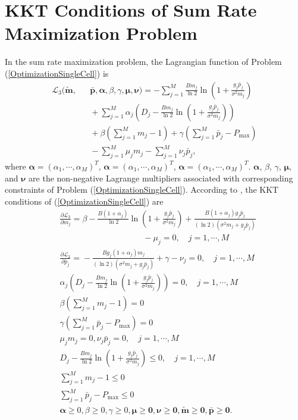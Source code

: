 \documentclass[journal]{IEEEtran}
\begin{document}
\section{KKT Conditions of Sum Rate Maximization Problem}
In the sum rate maximization problem, the Lagrangian function of Problem (\ref{OptimizationSingleCell}) is
\begin{eqnarray*}
\mathcal L_3(\pmb{\tilde m }, &&\!\!\!\!\!\!\!\!\!\!\pmb{\bar p}, \pmb{\alpha}, \beta ,\gamma, \pmb \mu, \pmb \nu)
=
-{\sum_{j=1}^M \frac{B m_j}{\ln2} \ln\left(1+\frac{g_j \bar p_j}{\sigma^2 m_j}\right)}
\\
 &&\!\!\!\!
+\sum_{j=1}^M \alpha_j \left({D_j-\frac{B m_j}{\ln2} \ln\left(1+\frac{g_j \bar p_j}{\sigma^2 m_j}\right)}\right)
\\
 &&\!\!\!\!
+\beta \left(\sum_{j=1}^{M}m_j -1\right)
+\gamma \left(\sum_{j=1}^M \bar p_j-P_{\max}\right)
\\
&&\!\!\!\!
-\sum_{j=1}^M \mu_j m_j -\sum_{j=1}^M \nu_j \bar p_j
,
\end{eqnarray*}
where $\pmb \alpha=(\alpha_1, \cdots, \alpha_M)^T$, $\pmb \alpha=(\alpha_1, \cdots, \alpha_M)^T$, $\pmb \alpha=(\alpha_1, \cdots, \alpha_M)^T$.
$\pmb \alpha$, $\beta$, $\gamma$, $\pmb \mu$, and $\pmb \nu$ are the non-negative Lagrange multipliers associated with corresponding constraints of Problem (\ref{OptimizationSingleCell}).
According to \cite{boyd2004convex}, the KKT conditions of (\ref{OptimizationSingleCell}) are
\begin{subequations}\label{KKT2}
\begin{align}
&\frac{\partial \mathcal L_3}
{\partial m_j}\!=\!
 \beta\!-\! {\frac{B(1\!+\!\alpha_j)}{\ln2}}  \!\ln\left(\!1\!\!+\!\!\frac{g_j \bar p_j}{\sigma^2 m_j}\!\right)
\!\!+\!\!
{\frac{B(1\!\!+\!\!\alpha_j){g_j \bar p_j}}{(\ln2)({\sigma^2 m_j\!\!+\!\!g_j\bar p_j})}}
\nonumber\\
&\qquad\qquad\qquad\qquad\qquad
-\mu_j= 0, \quad j =1, \cdots, M\\
&\frac{\partial \mathcal L_3}
{\partial \bar p_j}\!=\!-\frac{B{ g_j(1+\alpha_j)m_j}}{(\ln2){(\sigma^2 m_j\!+\!g_j\bar p_j)}} \!+\!\gamma
\!-\!\nu_j
\!=\!0, \quad j \!=\!1, \cdots, M\\
&\alpha_j \! \left(\!{D_j\!-\!\frac{B m_j}{\ln2} \ln\left(\!1\!+\!\frac{g_j \bar p_j}{\sigma^2 m_j}\!\right)}\!\right)
\!=\!0, \quad j \!=\!1, \cdots, M\\
&\beta \left(\sum_{j=1}^{M}m_j -1\right)
=0\\
&\gamma \left(\sum_{j=1}^M \bar p_j-P_{\max}\right)
=0\\
&\mu_jm_j=0, \nu_j\bar p_j=0,\quad j=1, \cdots, M \label{appendkktmunu}\\
&{D_j-\frac{B m_j}{\ln2} \ln\left(1+\frac{g_j \bar p_j}{\sigma^2 m_j}\right)}\leq 0,\quad j =1, \cdots, M\\
&\sum_{j=1}^{M}m_j-1
\leq 0\\
&{\sum_{j=1}^M \bar p_j}-P_{\max}
\leq 0\\
&\pmb \alpha \geq 0, \beta \geq 0,\gamma \geq 0, \pmb \mu \geq \pmb 0, \pmb \nu \geq \pmb 0,
\pmb {\tilde m } \geq \pmb 0, \pmb {\bar p}  \geq \pmb 0.
\end{align}
\end{subequations}
\end{document}
